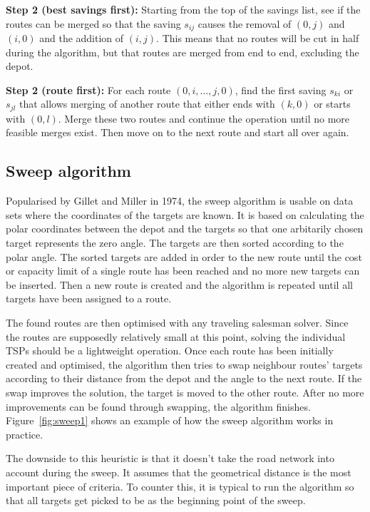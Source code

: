 \medskip
\noindent
\textbf{Step 2 (best savings first):} Starting from the top of the savings list, see if the routes can be merged so that the saving $s_{ij}$ causes the removal of $(0, j)$ and $(i, 0)$ and the addition of $(i, j)$. \cite{reimann2004d} This means that no routes will be cut in half during the algorithm, but that routes are merged from end to end, excluding the depot.

\medskip
\noindent
\textbf{Step 2 (route first):} For each route $(0, i, \ldots, j, 0)$, find the first saving $s_{ki}$ or $s_{jl}$ that allows merging of another route that either ends with $(k, 0)$ or starts with $(0, l)$. Merge these two routes and continue the operation until no more feasible merges exist. Then move on to the next route and start all over again. \cite{laporte2000classical}

 



\subsection{Sweep algorithm}			

Popularised by Gillet and Miller in 1974, the sweep algorithm is usable on data sets where the coordinates of the targets are known. It is based on calculating the polar coordinates between the depot and the targets so that one arbitarily chosen target represents the zero angle. The targets are then sorted according to the polar angle. The sorted targets are added in order to the new route until the cost or capacity limit of a single route has been reached and no more new targets can be inserted. Then a new route is created and the algorithm is repeated until all targets have been assigned to a route. \cite{gillett1974heuristic}

The found routes are then optimised with any traveling salesman solver. Since the routes are supposedly relatively small at this point, solving the individual TSPs should be a lightweight operation. Once each route has been initially created and optimised, the algorithm then tries to swap neighbour routes' targets according to their distance from the depot and the angle to the next route. If the swap improves the solution, the target is moved to the other route. After no more improvements can be found through swapping, the algorithm finishes. \cite{gillett1974heuristic} Figure~\ref{fig:sweep1} shows an example of how the sweep algorithm works in practice. 

The downside to this heuristic is that it doesn't take the road network into account during the sweep. It assumes that the geometrical distance is the most important piece of criteria. To counter this, it is typical to run the algorithm so that all targets get picked to be as the beginning point of the sweep. \cite{reimann2004d} 


